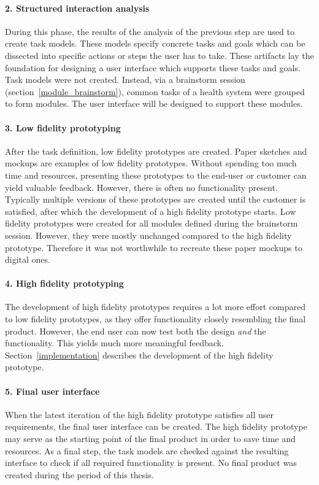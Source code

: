         \paragraph{2. Structured interaction analysis} During this phase, the results of the analysis of the previous step are used to create task models. These models specify concrete tasks and goals which can be dissected into specific actions or steps the user has to take. These artifacts lay the foundation for designing a user interface which supports these tasks and goals. Task models were not created. Instead, via a brainstorm session (section~\ref{module_brainstorm}), common tasks of a health system were grouped to form modules. The user interface will be designed to support these modules.

        \paragraph{3. Low fidelity prototyping} After the task definition, low fidelity prototypes are created. Paper sketches and mockups are examples of low fidelity prototypes. Without spending too much time and resources, presenting these prototypes to the end-user or customer can yield valuable feedback. However, there is often no functionality present. Typically multiple versions of these prototypes are created until the customer is satisfied, after which the development of a high fidelity prototype starts. Low fidelity prototypes were created for all modules defined during the brainstorm session. However, they were mostly unchanged compared to the high fidelity prototype. Therefore it was not worthwhile to recreate these paper mockups to digital ones.

        \paragraph{4. High fidelity prototyping} The development of high fidelity prototypes requires a lot more effort compared to low fidelity prototypes, as they offer functionality closely resembling the final product. However, the end user can now test both the design \emph{and} the functionality. This yields much more meaningful feedback. Section~\ref{implementation} describes the development of the high fidelity prototype.

        \paragraph{5. Final user interface} When the latest iteration of the high fidelity prototype satisfies all user requirements, the final user interface can be created. The high fidelity prototype may serve as the starting point of the final product in order to save time and resources. As a final step, the task models are checked against the resulting interface to check if all required functionality is present. No final product was created during the period of this thesis. 

